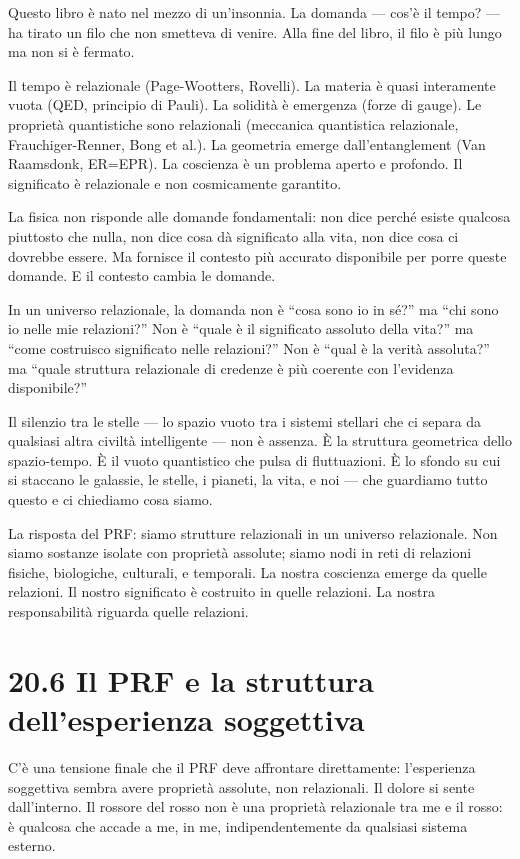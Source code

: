 \documentclass[11.5pt,a4paper,openany]{book}
\theoremstyle{remark}
\begin{document}
Questo libro è nato nel mezzo di un'insonnia. La domanda --- cos'è il tempo? --- ha tirato un filo che non smetteva di venire. Alla fine del libro, il filo è più lungo ma non si è fermato.

Il tempo è relazionale (Page-Wootters, Rovelli). La materia è quasi interamente vuota (QED, principio di Pauli). La solidità è emergenza (forze di gauge). Le proprietà quantistiche sono relazionali (meccanica quantistica relazionale, Frauchiger-Renner, Bong et al.). La geometria emerge dall'entanglement (Van Raamsdonk, ER=EPR). La coscienza è un problema aperto e profondo. Il significato è relazionale e non cosmicamente garantito.

La fisica non risponde alle domande fondamentali: non dice perché esiste qualcosa piuttosto che nulla, non dice cosa dà significato alla vita, non dice cosa ci dovrebbe essere. Ma fornisce il contesto più accurato disponibile per porre queste domande. E il contesto cambia le domande.

In un universo relazionale, la domanda non è ``cosa sono io in sé?'' ma ``chi sono io nelle mie relazioni?'' Non è ``quale è il significato assoluto della vita?'' ma ``come costruisco significato nelle relazioni?'' Non è ``qual è la verità assoluta?'' ma ``quale struttura relazionale di credenze è più coerente con l'evidenza disponibile?''

Il silenzio tra le stelle --- lo spazio vuoto tra i sistemi stellari che ci separa da qualsiasi altra civiltà intelligente --- non è assenza. È la struttura geometrica dello spazio-tempo. È il vuoto quantistico che pulsa di fluttuazioni. È lo sfondo su cui si staccano le galassie, le stelle, i pianeti, la vita, e noi --- che guardiamo tutto questo e ci chiediamo cosa siamo.

La risposta del PRF: siamo strutture relazionali in un universo relazionale. Non siamo sostanze isolate con proprietà assolute; siamo nodi in reti di relazioni fisiche, biologiche, culturali, e temporali. La nostra coscienza emerge da quelle relazioni. Il nostro significato è costruito in quelle relazioni. La nostra responsabilità riguarda quelle relazioni.

\section{20.6 Il PRF e la struttura dell'esperienza soggettiva}

C'è una tensione finale che il PRF deve affrontare direttamente: l'esperienza soggettiva sembra avere proprietà assolute, non relazionali. Il dolore si sente dall'interno. Il rossore del rosso non è una proprietà relazionale tra me e il rosso: è qualcosa che accade a me, in me, indipendentemente da qualsiasi sistema esterno.
\end{document}
